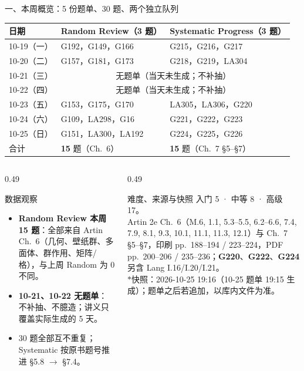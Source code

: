 \documentclass[aspectratio=169,10pt,fontset=none]{ctexbeamer}
\newcommand{\ex}[1]{\textcolor{accent}{\footnotesize\bfseries #1}}
\newcommand{\starpt}{\textcolor{accent}{\bfseries$\ast$}}
\begin{document}
\begin{frame}[t]{一、本周概览：5 份题单、30 题、两个独立队列}
  \label{sec:overview}
  \centering
  \scriptsize
  \setlength{\tabcolsep}{3pt}
  \renewcommand{\arraystretch}{1.14}
  \begin{tabular}{@{}l l l@{}}
    \toprule
    日期 & Random Review（3 题） & Systematic Progress（3 题）\\
    \midrule
    10-19（一） & G192，G149，G166 & G215，G216，G217\\
    10-20（二） & G157，G181，G173 & G218，G219，LA304\\
    \rowcolor{ink!7} 10-21（三） & \multicolumn{2}{c}{无题单（当天未生成；不补抽）}\\
    \rowcolor{ink!7} 10-22（四） & \multicolumn{2}{c}{无题单（当天未生成；不补抽）}\\
    10-23（五） & G153，G175，G170 & LA305，LA306，G220\\
    10-24（六） & G109，LA298，G16 & G221，G222，G223\\
    10-25（日） & G151，LA300，LA192 & G224，G225，G226\\
    \midrule
    合计 & \textbf{15} 题（Ch.~6） & \textbf{15} 题（Ch.~7 \S5--\S7）\\
    \bottomrule
  \end{tabular}
  \vspace{0.35em}
  \raggedright
  \begin{columns}[T,onlytextwidth]
    \begin{column}{0.49\textwidth}
      \begin{exampleblock}{\footnotesize 数据观察}
        \scriptsize
        \begin{itemize}\setlength{\itemsep}{1pt}
          \item \textbf{Random Review 本周 15 题}：全部来自 Artin Ch.~6（几何、壁纸群、多面体、群作用、矩阵/格），与上周 Random 为 0 不同。
          \item \textbf{10-21、10-22 无题单}：不补抽、不臆造；讲义只覆盖实际生成的 5 天。
          \item 30 题全部互不重复；Systematic 按原书题号推进 \S5.8 $\to$ \S7.4。
        \end{itemize}
      \end{exampleblock}
    \end{column}
    \begin{column}{0.49\textwidth}
      \begin{block}{\footnotesize 难度、来源与快照}
        \scriptsize
        入门 5 · 中等 8 · 高级 17。\\[1pt]
        Artin 2e Ch.~6（M.6, 1.1, 5.3--5.5, 6.2--6.6, 7.4, 7.9, 8.1, 9.3, 10.1, 11.1, 11.3, 12.1）与 Ch.~7 \S5--\S7，印刷 pp.~188--194 / 223--224，PDF pp.~200--206 / 235--236；\ex{G220}、\ex{G222}、\ex{G224} 另含 Lang I.16/I.20/I.21。\\[1pt]
        \starpt 快照：2026-10-25 19:16（10-25 题单 19:15 生成）；题单之后若追加，以库内文件为准。
      \end{block}
    \end{column}
  \end{columns}
\end{frame}
\end{document}
